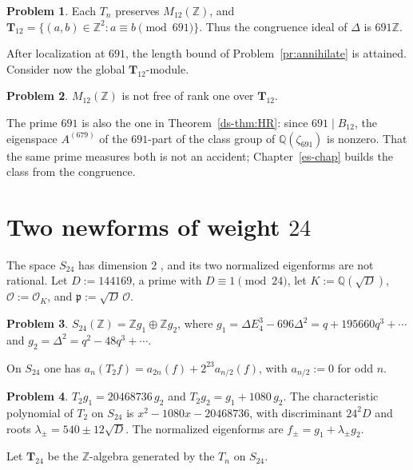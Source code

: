 \documentclass[reqno]{amsart}
\newcounter{chap}
\theoremstyle{definition}
\newtheorem{problem}{Problem}[section]
\theoremstyle{plain}
\newcommand{\Z}{\mathbb{Z}}
\newcommand{\Q}{\mathbb{Q}}
\newcommand{\Oc}{\mathcal{O}}
\newcommand{\T}{\mathbf{T}}
\newcommand{\pp}{\mathfrak{p}}
\begin{document}
\begin{problem}\label{pr:hecke12}
Each \(T_n\) preserves \(M_{12}(\Z)\), and \(\T_{12} = \{(a,b) \in \Z^2 : a \equiv b \pmod{691}\}\).  Thus the congruence ideal of \(\Delta\) is \(691\Z\).
\end{problem}

After localization at \(691\), the length bound of Problem~\ref{pr:annihilate} is attained.  Consider now the global \(\T_{12}\)-module.

\begin{problem}\label{pr:notfree}
\(M_{12}(\Z)\) is not free of rank one over \(\T_{12}\).
\end{problem}  The prime \(691\) is also the one in Theorem~\ref{ds-thm:HR}: since \(691 \mid B_{12}\), the eigenspace \(A^{(679)}\) of the \(691\)-part of the class group of \(\Q(\zeta_{691})\) is nonzero.  That the same prime measures both is not an accident; Chapter~\ref{es-chap} builds the class from the congruence.

\section{Two newforms of weight \texorpdfstring{\(24\)}{24}}\label{sec:24}

The space \(S_{24}\) has dimension \(2\) \cite[Ch.~VII, \S3.2]{SeA}, and its two normalized eigenforms are not rational.  Let \(D := 144169\), a prime with \(D \equiv 1 \pmod{24}\), let \(K := \Q(\sqrt D)\), \(\Oc := \Oc_K\), and \(\pp := \sqrt D\,\Oc\).

\begin{problem}\label{pr:basis24}
\(S_{24}(\Z) = \Z g_1 \oplus \Z g_2\), where \(g_1 = \Delta E_4^3 - 696\Delta^2 = q + 195660 q^3 + \cdots\) and \(g_2 = \Delta^2 = q^2 - 48q^3 + \cdots\).
\end{problem}

On \(S_{24}\) one has \(a_n(T_2 f) = a_{2n}(f) + 2^{23} a_{n/2}(f)\), with \(a_{n/2} := 0\) for odd \(n\).

\begin{problem}\label{pr:T2}
\(T_2 g_1 = 20468736\, g_2\) and \(T_2 g_2 = g_1 + 1080\, g_2\).  The characteristic polynomial of \(T_2\) on \(S_{24}\) is \(x^2 - 1080x - 20468736\), with discriminant \(24^2 D\) and roots \(\lambda_\pm = 540 \pm 12\sqrt D\).  The normalized eigenforms are \(f_\pm = g_1 + \lambda_\pm g_2\).
\end{problem}

Let \(\T_{24}\) be the \(\Z\)-algebra generated by the \(T_n\) on \(S_{24}\).
\end{document}
